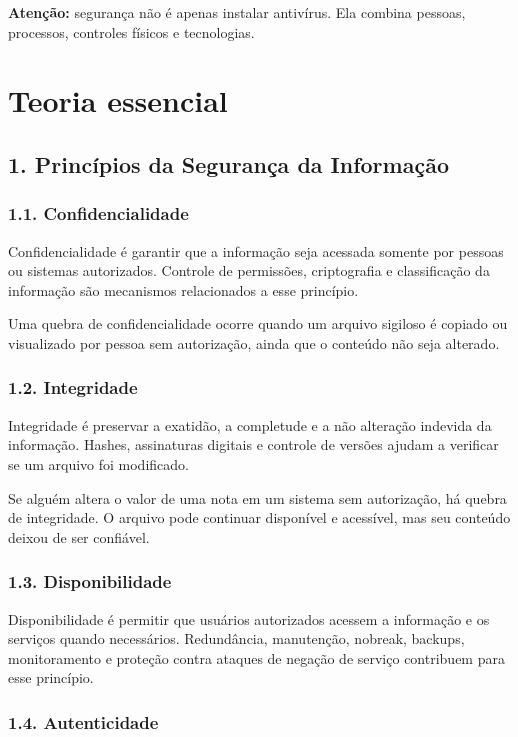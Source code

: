 \documentclass[11pt,a4paper]{article}
\begin{document}
\textbf{Atenção:} segurança não é apenas instalar antivírus. Ela combina pessoas, processos, controles físicos e tecnologias.

\section*{Teoria essencial}

\subsection*{1. Princípios da Segurança da Informação}

\subsubsection*{1.1. Confidencialidade}

Confidencialidade é garantir que a informação seja acessada somente por pessoas ou sistemas autorizados. Controle de permissões, criptografia e classificação da informação são mecanismos relacionados a esse princípio.

Uma quebra de confidencialidade ocorre quando um arquivo sigiloso é copiado ou visualizado por pessoa sem autorização, ainda que o conteúdo não seja alterado.

\subsubsection*{1.2. Integridade}

Integridade é preservar a exatidão, a completude e a não alteração indevida da informação. Hashes, assinaturas digitais e controle de versões ajudam a verificar se um arquivo foi modificado.

Se alguém altera o valor de uma nota em um sistema sem autorização, há quebra de integridade. O arquivo pode continuar disponível e acessível, mas seu conteúdo deixou de ser confiável.

\subsubsection*{1.3. Disponibilidade}

Disponibilidade é permitir que usuários autorizados acessem a informação e os serviços quando necessários. Redundância, manutenção, nobreak, backups, monitoramento e proteção contra ataques de negação de serviço contribuem para esse princípio.

\subsubsection*{1.4. Autenticidade}
\end{document}
